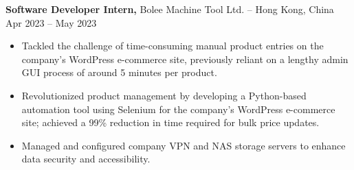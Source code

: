\textbf{Software Developer Intern,} {Bolee Machine Tool Ltd.} -- Hong Kong, China \hfill Apr 2023 -- May 2023 \\
\vspace{-9pt}
\begin{itemize}
  \item Tackled the challenge of time-consuming manual product entries on the company’s WordPress e-commerce site, previously reliant on a lengthy admin GUI process of around 5 minutes per product.
  \item Revolutionized product management by developing a Python-based automation tool using Selenium for the company’s WordPress e-commerce site; achieved a 99\% reduction in time required for bulk price updates.
  \item Managed and configured company VPN and NAS storage servers to enhance data security and accessibility.
\end{itemize}